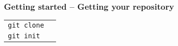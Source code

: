 \documentclass{beamer}
\begin{document}
\begin{frame}[fragile]
  \frametitle{Getting started -- Getting your repository}
  \begin{tabular}{ll}
    \texttt{git clone} & \\
    \texttt{git init} & \\
  \end{tabular}
\end{frame}

\end{document}
